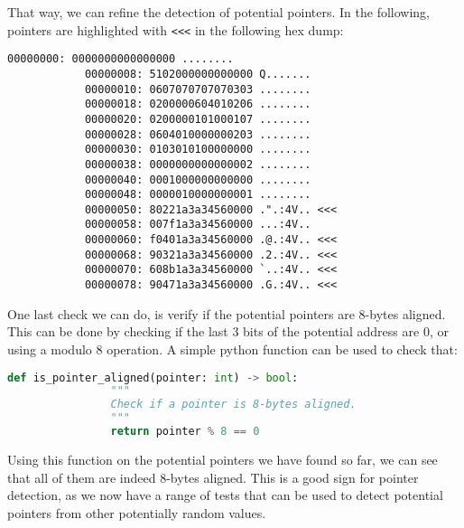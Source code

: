     \begin{minipage}{\dimexpr\linewidth-20pt}
        That way, we can refine the detection of potential pointers. In the following, pointers are highlighted with \lstinline[style=hexdump]!<<<! in the following hex dump:

        \begin{lstlisting}[style=hexdump, caption={8 bytes per line visualization of a Hex Dump from \textit{Training/basic/V\_7\_8\_P1/16/5070-1643978841-heap.raw}}]
            00000000: 0000000000000000 ........
            00000008: 5102000000000000 Q.......
            00000010: 0607070707070303 ........
            00000018: 0200000604010206 ........
            00000020: 0200000101000107 ........
            00000028: 0604010000000203 ........
            00000030: 0103010100000000 ........
            00000038: 0000000000000002 ........
            00000040: 0001000000000000 ........
            00000048: 0000010000000001 ........
            00000050: 80221a3a34560000 .".:4V.. <<<
            00000058: 007f1a3a34560000 ...:4V.. 
            00000060: f0401a3a34560000 .@.:4V.. <<<
            00000068: 90321a3a34560000 .2.:4V.. <<<
            00000070: 608b1a3a34560000 `..:4V.. <<<
            00000078: 90471a3a34560000 .G.:4V.. <<<
        \end{lstlisting}
    \end{minipage}

    \begin{minipage}{\dimexpr\linewidth-20pt}
        One last check we can do, is verify if the potential pointers are  8-bytes aligned. This can be done by checking if the last 3 bits of the potential address are 0, or using a modulo 8 operation. A simple python function can be used to check that:

        \begin{lstlisting}[language=python, caption={Python function to check if a potential pointer is 8-bytes aligned}]
            def is_pointer_aligned(pointer: int) -> bool:
                """
                Check if a pointer is 8-bytes aligned.
                """
                return pointer % 8 == 0
        \end{lstlisting}
    \end{minipage}

    Using this function on the potential pointers we have found so far, we can see that all of them are indeed 8-bytes aligned. This is a good sign for pointer detection, as we now have a range of tests that can be used to detect potential pointers from other potentially random values.

